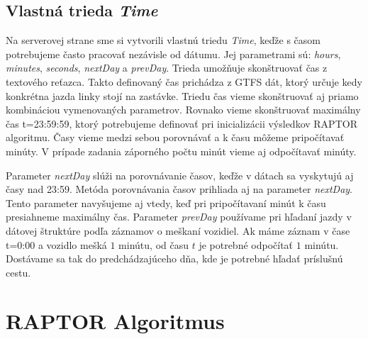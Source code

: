 \subsection{Vlastná trieda \textit{Time}}
Na serverovej strane sme si vytvorili vlastnú triedu \textit{Time}, keďže s časom potrebujeme často pracovať nezávisle od dátumu. Jej parametrami sú: \textit{hours}, \textit{minutes}, \textit{seconds}, \textit{nextDay} a \textit{prevDay}. Trieda umožňuje skonštruovať čas z textového reťazca. Takto definovaný čas prichádza z GTFS dát, ktorý určuje kedy konkrétna jazda linky stojí na zastávke. Triedu čas vieme skonštruovať aj priamo kombináciou vymenovaných parametrov. Rovnako vieme skonštruovať maximálny čas t=23:59:59, ktorý potrebujeme definovať pri inicializácii výsledkov RAPTOR algoritmu. Časy vieme medzi sebou porovnávať a k času môžeme pripočítavať minúty. V prípade zadania záporného počtu minút vieme aj odpočítavať minúty. 

Parameter \textit{nextDay} slúži na porovnávanie časov, keďže v dátach sa vyskytujú aj časy nad 23:59. Metóda porovnávania časov prihliada aj na parameter \textit{nextDay}. Tento parameter navyšujeme aj vtedy, keď pri pripočítavaní minút k času presiahneme maximálny čas.
Parameter \textit{prevDay} používame pri hľadaní jazdy v dátovej štruktúre podľa záznamov o meškaní vozidiel. Ak  máme záznam v čase t=0:00 a vozidlo mešká $1$ minútu, od času $t$ je potrebné odpočítať $1$ minútu. Dostávame sa tak do predchádzajúceho dňa, kde je potrebné hľadať príslušnú cestu. 

\section{RAPTOR Algoritmus}

